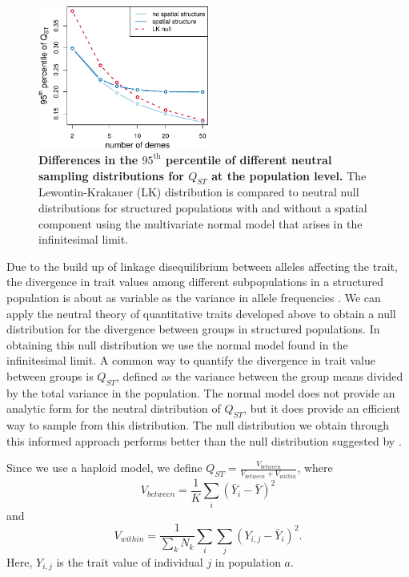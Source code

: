 \begin{figure}
  \centering
  \includegraphics[width=0.5\textwidth]{./figures/qst_deme_percentile_nospace.pdf}
  \caption{\textbf{Differences in the $95^{\mathrm{th}}$ percentile of different
      neutral sampling distributions for $Q_{ST}$ at the population level.} The
    Lewontin-Krakauer (LK) distribution is compared to neutral null
    distributions for structured populations with and without a spatial
    component using the multivariate normal model that arises in the
    infinitesimal limit.}
  \label{fig:qst_perc}
\end{figure}

Due to the build up of linkage disequilibrium between alleles affecting the
trait, the divergence in trait values among different subpopulations in a
structured population is about as variable as the variance in allele frequencies
\citep{Rogers1983}. We can apply the neutral theory of quantitative traits
developed above to obtain a null distribution for the divergence between groups
in structured populations. In obtaining this null distribution we use the normal
model found in the infinitesimal limit. A common way to quantify the divergence
in trait value between groups is $Q_{ST}$, defined as the variance between the
group means divided by the total variance in the population. The normal model
does not provide an analytic form for the neutral distribution of $Q_{ST}$, but
it does provide an efficient way to sample from this distribution. The null
distribution we obtain through this informed approach performs better than the
null distribution suggested by \citet{Whitlock2009}.

Since we use a haploid model, we define $Q_{ST} = \frac{V_{between}}{V_{between}
  + V_{within}}$, where
\begin{equation*}
  V_{between} = \frac{1}{K} \sum_i \left( \bar{Y}_i - \bar{Y} \right)^2
\end{equation*}
and
\begin{equation*}
  V_{within} = \frac{1}{\sum_k N_k} \sum_i \sum_j \left( Y_{i,j} - \bar{Y}_i \right)^2.
\end{equation*}
Here, $Y_{i,j}$ is the trait value of individual $j$ in population $a$.

